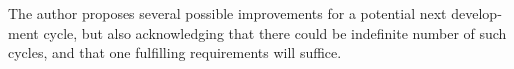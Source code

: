 \begin{english}
	The author proposes several possible improvements for a
	potential next development cycle, but also acknowledging that there
	could be indefinite number of such cycles, and that one fulfilling
	requirements will suffice.
	
	
	
\end{english}

\clearpage
\begin{russian} %
	\abstitlestyle{\abstractname} %
	
	\todo \\
\end{russian}
